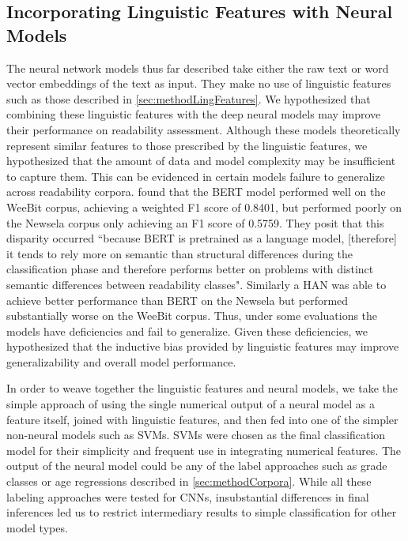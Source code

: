 \documentclass[11pt,a4paper]{article}
\theoremstyle{definition}
\begin{document}
\subsection{Incorporating Linguistic Features with Neural Models}
\label{lingPlusNeural}
The neural network models thus far described take either the raw text or word vector embeddings of the text as input. They make no use of linguistic features such as those described in \cref{sec:methodLingFeatures}. We hypothesized that combining these linguistic features with the deep neural models may improve their performance on readability assessment. Although these models theoretically represent similar features to those prescribed by the linguistic features, we hypothesized that the amount of data and model complexity may be insufficient to capture them. This can be evidenced in certain models failure to generalize across readability corpora. \citet{martincSupervisedUnsupervisedNeural2019} found that the BERT model performed well on the WeeBit corpus, achieving a weighted F1 score of 0.8401, but performed poorly on the Newsela corpus only achieving an F1 score of 0.5759. They posit that this disparity occurred ``because BERT is pretrained as a language model, [therefore] it tends
to rely more on semantic than structural differences during the classification phase
and therefore performs better on problems with distinct semantic differences between
readability classes". Similarly a HAN was able to achieve better performance than BERT on the Newsela but performed substantially worse on the WeeBit corpus. Thus, under some evaluations the models have deficiencies and fail to generalize. Given these deficiencies, we hypothesized that the inductive bias provided by linguistic features may improve generalizability and overall model performance.

In order to weave together the linguistic features and neural models, we take the simple approach of using the single numerical output of a neural model as a feature itself, joined with linguistic features, and then fed into one of the simpler non-neural models such as SVMs. SVMs were chosen as the final classification model for their simplicity and frequent use in integrating numerical features. The output of the neural model could be any of the label approaches such as grade classes or age regressions described in \cref{sec:methodCorpora}. While all these labeling approaches were tested for CNNs, insubstantial differences in final inferences led us to restrict intermediary results to simple classification for other model types.
\end{document}
